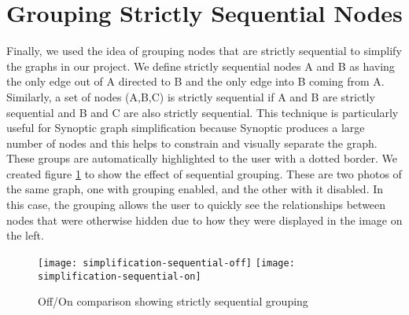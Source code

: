 \section{Grouping Strictly Sequential Nodes}
Finally, we used the idea of grouping nodes that are strictly sequential to simplify the graphs in our project. We define strictly sequential nodes A and B as having the only edge out of A directed to B and the only edge into B coming from A. Similarly, a set of nodes (A,B,C) is strictly sequential if A and B are strictly sequential and B and C are also strictly sequential. This technique is particularly useful for Synoptic graph simplification because Synoptic produces a large number of nodes and this helps to constrain and visually separate the graph. These groups are automatically highlighted to the user with a dotted border. We created figure \ref{fig:seq-on-off} to show the effect of sequential grouping. These are two photos of the same graph, one with grouping enabled, and the other with it disabled. In this case, the grouping allows the user to quickly see the relationships between nodes that were otherwise hidden due to how they were displayed in the image on the left.


\begin{figure}[!ht]
\centering
\texttt{[image: simplification-sequential-off]}
\texttt{[image: simplification-sequential-on]}
\caption{Off/On comparison showing strictly sequential grouping}
    \label{fig:seq-on-off}
\end{figure}

